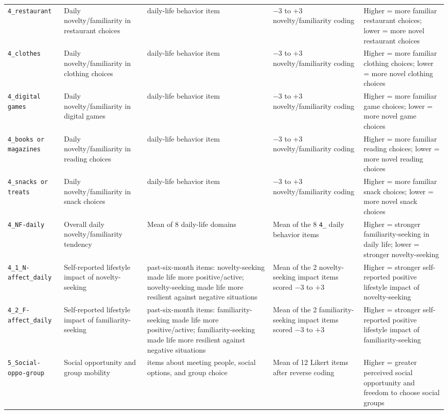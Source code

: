 \begin{longtable}{>{\raggedright\arraybackslash}p{3.6cm}>{\raggedright\arraybackslash}p{2.4cm}>{\raggedright\arraybackslash}p{2.7cm}>{\raggedright\arraybackslash}p{2.5cm}>{\raggedright\arraybackslash}p{3.4cm}}
\texttt{4\_restaurant} & Daily novelty/familiarity in restaurant choices & 1 daily-life behavior item & $-$3 to $+$3 novelty/familiarity coding & Higher = more familiar restaurant choices; lower = more novel restaurant choices \\
\texttt{4\_clothes} & Daily novelty/familiarity in clothing choices & 1 daily-life behavior item & $-$3 to $+$3 novelty/familiarity coding & Higher = more familiar clothing choices; lower = more novel clothing choices \\
\texttt{4\_digital games} & Daily novelty/familiarity in digital games & 1 daily-life behavior item & $-$3 to $+$3 novelty/familiarity coding & Higher = more familiar game choices; lower = more novel game choices \\
\texttt{4\_books or magazines} & Daily novelty/familiarity in reading choices & 1 daily-life behavior item & $-$3 to $+$3 novelty/familiarity coding & Higher = more familiar reading choices; lower = more novel reading choices \\
\texttt{4\_snacks or treats} & Daily novelty/familiarity in snack choices & 1 daily-life behavior item & $-$3 to $+$3 novelty/familiarity coding & Higher = more familiar snack choices; lower = more novel snack choices \\
\texttt{4\_NF-daily} & Overall daily novelty/familiarity tendency & Mean of 8 daily-life domains & Mean of the 8 \texttt{4\_} daily behavior items & Higher = stronger familiarity-seeking in daily life; lower = stronger novelty-seeking \\
\texttt{4\_1\_N-affect\_daily} & Self-reported lifestyle impact of novelty-seeking & 2 past-six-month items: novelty-seeking made life more positive/active; novelty-seeking made life more resilient against negative situations & Mean of the 2 novelty-seeking impact items scored $-$3 to $+$3 & Higher = stronger self-reported positive lifestyle impact of novelty-seeking \\
\texttt{4\_2\_F-affect\_daily} & Self-reported lifestyle impact of familiarity-seeking & 2 past-six-month items: familiarity-seeking made life more positive/active; familiarity-seeking made life more resilient against negative situations & Mean of the 2 familiarity-seeking impact items scored $-$3 to $+$3 & Higher = stronger self-reported positive lifestyle impact of familiarity-seeking \\
\texttt{5\_Social-oppo-group} & Social opportunity and group mobility & 12 items about meeting people, social options, and group choice & Mean of 12 Likert items after reverse coding & Higher = greater perceived social opportunity and freedom to choose social groups \\

\end{longtable}
